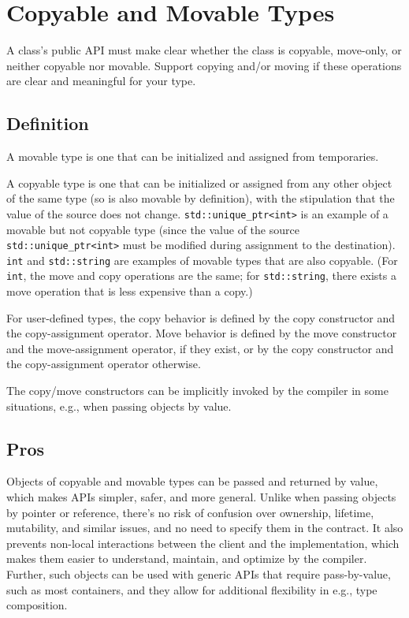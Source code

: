 
\section{Copyable and Movable Types}\label{sec:copyable-and-movable-types}
A class's public API must make clear whether the class is copyable, move-only, or neither copyable nor movable. Support copying and/or moving if these operations are clear and meaningful for your type.

\subsection{Definition}
A movable type is one that can be initialized and assigned from temporaries.

A copyable type is one that can be initialized or assigned from any other object of the same type (so is also movable by definition), with the stipulation that the value of the source does not change. \texttt{std::unique_ptr<int>} is an example of a movable but not copyable type (since the value of the source \texttt{std::unique_ptr<int>} must be modified during assignment to the destination). \texttt{int} and \texttt{std::string} are examples of movable types that are also copyable. (For \texttt{int}, the move and copy operations are the same; for \texttt{std::string}, there exists a move operation that is less expensive than a copy.)

For user-defined types, the copy behavior is defined by the copy constructor and the copy-assignment operator. Move behavior is defined by the move constructor and the move-assignment operator, if they exist, or by the copy constructor and the copy-assignment operator otherwise.

The copy/move constructors can be implicitly invoked by the compiler in some situations, e.g., when passing objects by value.

\subsection{Pros}
Objects of copyable and movable types can be passed and returned by value, which makes APIs simpler, safer, and more general. Unlike when passing objects by pointer or reference, there's no risk of confusion over ownership, lifetime, mutability, and similar issues, and no need to specify them in the contract. It also prevents non-local interactions between the client and the implementation, which makes them easier to understand, maintain, and optimize by the compiler. Further, such objects can be used with generic APIs that require pass-by-value, such as most containers, and they allow for additional flexibility in e.g., type composition.

